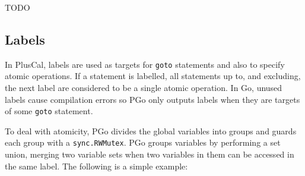TODO

\subsection{Labels}
\label{sec:labels}
In PlusCal, labels are used as targets for \texttt{goto} statements and also to specify atomic operations. If a statement is labelled, all statements up to, and excluding, the next label are considered to be a single atomic operation. In Go, unused labels cause compilation errors so PGo only outputs labels when they are targets of some \texttt{goto} statement.

To deal with atomicity, PGo divides the global variables into groups and guards each group with a \texttt{sync.RWMutex}. PGo groups variables by performing a set union, merging two variable sets when two variables in them can be accessed in the same label. The following is a simple example:

